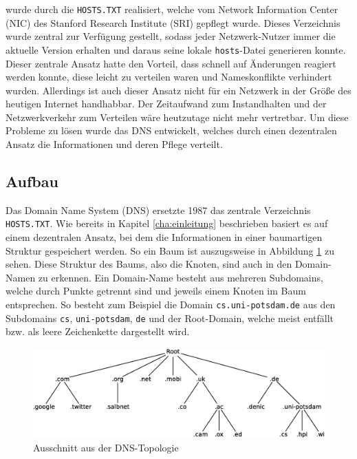 \documentclass[a4paper, 12pt, BCOR10mm, DIV12, toc=bibliography, toc=listof, german]{scrbook}
\def \dns {Domain Name System (DNS)}
\begin{document}
			wurde durch die \texttt{HOSTS.TXT} realisiert, welche vom Network Information Center (NIC) des
			Stanford Research Institute (SRI) gepflegt wurde. Dieses Verzeichnis wurde zentral zur
			Verfügung gestellt, sodass jeder Netzwerk-Nutzer immer die aktuelle Version erhalten und
			daraus seine lokale \texttt{hosts}-Datei generieren konnte.  Dieser zentrale Ansatz hatte den
			Vorteil, dass schnell auf Änderungen reagiert werden konnte, diese leicht zu verteilen waren
			und Nameskonflikte verhindert wurden.  Allerdings ist auch dieser Ansatz nicht für ein
			Netzwerk in der Größe des heutigen Internet handhabbar.  Der Zeitaufwand zum Instandhalten und
			der Netzwerkverkehr zum Verteilen wäre heutzutage nicht mehr vertretbar. Um diese Probleme zu
			lösen wurde das DNS \cite{rfc1034} entwickelt, welches durch einen dezentralen Ansatz die
			Informationen und deren Pflege verteilt.

			


			\subsection{Aufbau} %
			\label{sub:aufbau}

			Das \dns{} ersetzte 1987 das zentrale Verzeichnis \texttt{HOSTS.TXT}. Wie bereits in Kapitel
			\ref{cha:einleitung} beschrieben basiert es auf einem dezentralen Ansatz, bei dem die
			Informationen in einer baumartigen Struktur gespeichert werden. So ein Baum ist auszugsweise
			in Abbildung \ref{fig:dns-tree} zu sehen. Diese Struktur des Baums, also die Knoten, sind auch
			in den Domain-Namen zu erkennen. Ein Domain-Name besteht aus mehreren Subdomains, welche durch
			Punkte getrennt sind und jeweils einem Knoten im Baum entsprechen. So besteht zum Beispiel die
			Domain \texttt{cs.uni-potsdam.de} aus den Subdomains \texttt{cs}, \texttt{uni-potsdam},
			\texttt{de} und der Root-Domain, welche meist entfällt bzw. als leere Zeichenkette
			\glqq{}\grqq{} dargestellt wird.

			\begin{figure}
				\centering
				\includegraphics[width=\textwidth]{images/dns-tree-domains}
				\caption{Ausschnitt aus der DNS-Topologie} %
				\label{fig:dns-tree}
			\end{figure}
\end{document}
